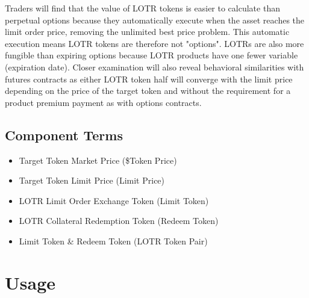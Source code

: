 \documentclass[12pt]{article}
\begin{document}
   Traders will find that the value of LOTR tokens is easier to calculate than perpetual options because they automatically execute when the asset reaches the limit order price, removing the unlimited best price problem. This automatic execution means LOTR tokens are therefore not "options". LOTRs are also more fungible than expiring options because LOTR products have one fewer variable (expiration date). Closer examination will also reveal behavioral similarities with futures contracts as either LOTR token half will converge with the limit price depending on the price of the target token and without the requirement for a product premium payment as with options contracts.

      \subsection*{Component Terms}
         \begin{itemize}{}{}
            \item Target Token Market Price (\$Token Price)
            \item Target Token Limit Price (Limit Price)
            \item LOTR Limit Order Exchange Token (Limit Token)
            \item LOTR Collateral Redemption Token (Redeem Token)
            \item Limit Token \& Redeem Token (LOTR Token Pair)
         \end{itemize}

   \section{Usage}
\end{document}
